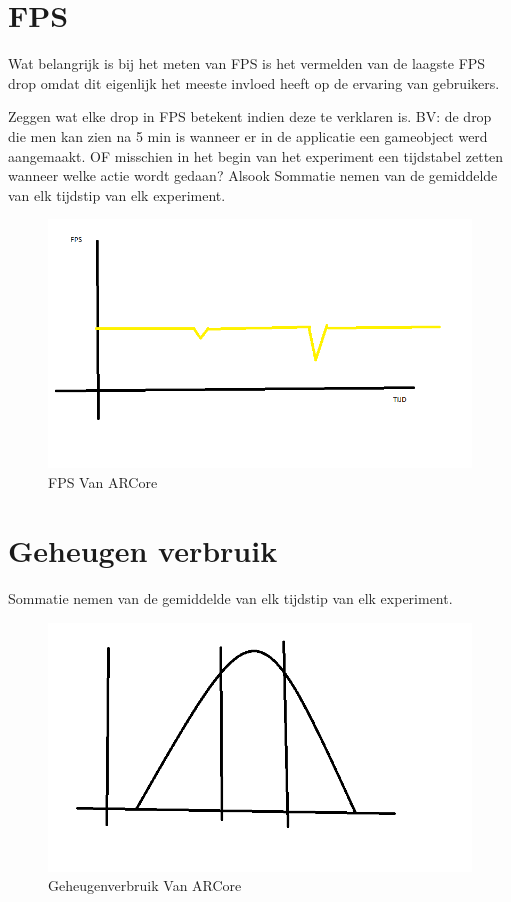\section{FPS}
Wat belangrijk is bij het meten van FPS is het vermelden van de laagste FPS drop omdat dit eigenlijk het meeste invloed heeft op de ervaring van gebruikers.

Zeggen wat elke drop in FPS betekent indien deze te verklaren is. BV: de drop die men kan zien na 5 min is wanneer er in de applicatie een gameobject werd aangemaakt. OF misschien in het begin van het experiment een tijdstabel zetten wanneer welke actie wordt gedaan?
Alsook
Sommatie nemen van de gemiddelde van elk tijdstip van elk experiment.
\begin{figure}
    \includegraphics[width=\textwidth]{img/fpsgrafiek}\caption{FPS Van ARCore}\label{fig:fpsgr1}
\end{figure}
\section{Geheugen verbruik}
Sommatie nemen van de gemiddelde van elk tijdstip van elk experiment.
\begin{figure}
    \includegraphics[width=\textwidth]{img/normaleverdeling}\caption{Geheugenverbruik Van ARCore}\label{fig:mem1}
\end{figure}
